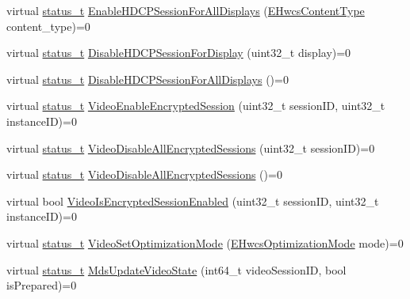 \begin{DoxyCompactItemize}
\item 
virtual \mbox{\hyperlink{hwcserviceapi_8h_a3806fb2027d9a316d8ca8d9b8b8eb96f}{status\+\_\+t}} \mbox{\hyperlink{classhwcomposer_1_1IControls_a29659284e29653ae4d7fe9767794c06e}{Enable\+H\+D\+C\+P\+Session\+For\+All\+Displays}} (\mbox{\hyperlink{hwcserviceapi_8h_a69e9b3a54e4c8e504845398c66eab655}{E\+Hwcs\+Content\+Type}} content\+\_\+type)=0
\item 
virtual \mbox{\hyperlink{hwcserviceapi_8h_a3806fb2027d9a316d8ca8d9b8b8eb96f}{status\+\_\+t}} \mbox{\hyperlink{classhwcomposer_1_1IControls_adfce6c02fc64430969111173989e0a9a}{Disable\+H\+D\+C\+P\+Session\+For\+Display}} (uint32\+\_\+t display)=0
\item 
virtual \mbox{\hyperlink{hwcserviceapi_8h_a3806fb2027d9a316d8ca8d9b8b8eb96f}{status\+\_\+t}} \mbox{\hyperlink{classhwcomposer_1_1IControls_a15854915f926445f5c67f2959e2b2131}{Disable\+H\+D\+C\+P\+Session\+For\+All\+Displays}} ()=0
\item 
virtual \mbox{\hyperlink{hwcserviceapi_8h_a3806fb2027d9a316d8ca8d9b8b8eb96f}{status\+\_\+t}} \mbox{\hyperlink{classhwcomposer_1_1IControls_a502ec367dd15a58771d4290e610641e6}{Video\+Enable\+Encrypted\+Session}} (uint32\+\_\+t session\+ID, uint32\+\_\+t instance\+ID)=0
\item 
virtual \mbox{\hyperlink{hwcserviceapi_8h_a3806fb2027d9a316d8ca8d9b8b8eb96f}{status\+\_\+t}} \mbox{\hyperlink{classhwcomposer_1_1IControls_a947e4a84ae4623fa3ff4df85db45be97}{Video\+Disable\+All\+Encrypted\+Sessions}} (uint32\+\_\+t session\+ID)=0
\item 
virtual \mbox{\hyperlink{hwcserviceapi_8h_a3806fb2027d9a316d8ca8d9b8b8eb96f}{status\+\_\+t}} \mbox{\hyperlink{classhwcomposer_1_1IControls_a3f60e4c78208d5ee55d0409cd7d96258}{Video\+Disable\+All\+Encrypted\+Sessions}} ()=0
\item 
virtual bool \mbox{\hyperlink{classhwcomposer_1_1IControls_a8a3368ae60a036bf5fa9ab5c3bdb9073}{Video\+Is\+Encrypted\+Session\+Enabled}} (uint32\+\_\+t session\+ID, uint32\+\_\+t instance\+ID)=0
\item 
virtual \mbox{\hyperlink{hwcserviceapi_8h_a3806fb2027d9a316d8ca8d9b8b8eb96f}{status\+\_\+t}} \mbox{\hyperlink{classhwcomposer_1_1IControls_a6ab5735df81c42f725641165136912f2}{Video\+Set\+Optimization\+Mode}} (\mbox{\hyperlink{hwcserviceapi_8h_a73044de23b8f474352d6753e21fca06d}{E\+Hwcs\+Optimization\+Mode}} mode)=0
\item 
virtual \mbox{\hyperlink{hwcserviceapi_8h_a3806fb2027d9a316d8ca8d9b8b8eb96f}{status\+\_\+t}} \mbox{\hyperlink{classhwcomposer_1_1IControls_ad2d374da82a11a7a6b2bade97dc87955}{Mds\+Update\+Video\+State}} (int64\+\_\+t video\+Session\+ID, bool is\+Prepared)=0

\end{DoxyCompactItemize}
